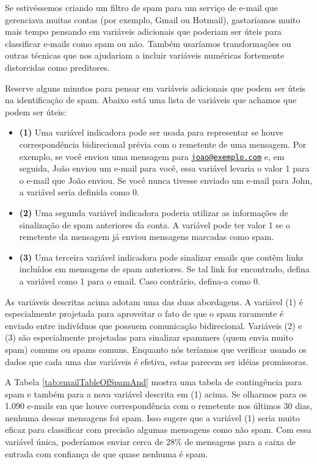 \documentclass[
]{book}
\theoremstyle{definition}
\theoremstyle{definition}
\theoremstyle{definition}
\theoremstyle{definition}
\theoremstyle{remark}
\begin{document}
Se estivéssemos criando um filtro de spam para um serviço de e-mail que gerenciava muitas contas (por exemplo, Gmail ou Hotmail), gastaríamos muito mais tempo pensando em variáveis adicionais que poderiam ser úteis para classificar e-mails como spam ou não. Também usaríamos transformações ou outras técnicas que nos ajudariam a incluir variáveis numéricas fortemente distorcidas como preditores.

Reserve alguns minutos para pensar em variáveis adicionais que podem ser úteis na identificação de spam. Abaixo está uma lista de variáveis que achamos que podem ser úteis:

\begin{itemize}
\item
  \textbf{(1)} Uma variável indicadora pode ser usada para representar se houve correspondência bidirecional prévia com o remetente de uma mensagem. Por exemplo, se você enviou uma mensagem para \href{mailto:joao@exemplo.com}{\nolinkurl{joao@exemplo.com}} e, em seguida, João enviou um e-mail para você, essa variável levaria o valor 1 para o e-mail que João enviou. Se você nunca tivesse enviado um e-mail para John, a variável seria definida como 0.
\item
  \textbf{(2)} Uma segunda variável indicadora poderia utilizar as informações de sinalização de spam anteriores da conta. A variável pode ter valor 1 se o remetente da mensagem já enviou mensagens marcadas como spam.
\item
  \textbf{(3)} Uma terceira variável indicadora pode sinalizar emails que contêm links incluídos em mensagens de spam anteriores. Se tal link for encontrado, defina a variável como 1 para o email. Caso contrário, defina-a como 0.
\end{itemize}

As variáveis descritas acima adotam uma das duas abordagens. A variável (1) é especialmente projetada para aproveitar o fato de que o spam raramente é enviado entre indivíduos que possuem comunicação bidirecional. Variáveis (2) e (3) são especialmente projetadas para sinalizar spammers (quem envia muito spam) comuns ou spams comuns. Enquanto nós teríamos que verificar usando os dados que cada uma das variáveis é efetiva, estas parecem ser idéias promissoras.

A Tabela \ref{tab:emailTableOfSpamAnd} mostra uma tabela de contingência para spam e também para a nova variável descrita em (1) acima. Se olharmos para os 1.090 e-mails em que houve correspondência com o remetente nos últimos 30 dias, nenhuma dessas mensagens foi spam. Isso sugere que a variável (1) seria muito eficaz para classificar com precisão algumas mensagens como não spam. Com essa variável única, poderíamos enviar cerca de 28\% de mensagens para a caixa de entrada com confiança de que quase nenhuma é spam.
\end{document}
